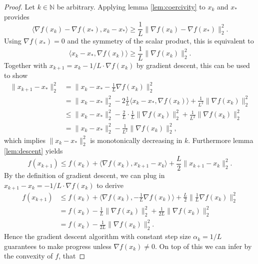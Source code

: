\documentclass[11pt, a4paper]{article}
\newcommand{\N}{\mathds{N}}
\begin{document}
\begin{proof}
Let $k \in \N$ be arbitrary. Applying lemma \ref{lem:coercivity} to $x_k$ and $x_*$ provides
\[ \big \langle \nabla f(x_k) - \nabla f(x_*), x_k - x_* \big \rangle \ge \frac{1}{L} \big \| \nabla f(x_k) - \nabla f(x_*) \big \|_2^2. \]
Using $\nabla f(x_*) = 0$ and the symmetry of the scalar product, this is equivalent to
\[ \big \langle x_k - x_* ,\nabla f(x_k) \big \rangle \ge \frac{1}{L} \big \| \nabla f(x_k) \big \|_2^2. \]
Together with $x_{k+1} = x_k - 1/L \cdot \nabla f(x_k)$ by gradient descent, this can be used to show
\begin{equation} \begin{split}
\big \| x_{k+1} - x_* \big \|_2^2
&= \big \| x_k - x_* - \frac{1}{L} \nabla f(x_k) \big \|_2^2 \\\
&= \big \| x_k - x_* \big \|_2^2 - 2 \frac{1}{L} \big \langle x_k - x_* , \nabla f(x_k) \big \rangle + \frac{1}{L^2} \big \| \nabla f(x_k) \big \|_2^2 \\\
&\leq \big \| x_k - x_* \big \|_2^2 - \frac{2}{L} \cdot \frac{1}{L} \big \| \nabla f(x_k) \big \|_2^2 + \frac{1}{L^2} \big \| \nabla f(x_k) \big \|_2^2 \\\
& = \big \| x_k - x_* \big \|_2^2 - \frac{1}{L^2} \big \| \nabla f(x_k) \big \|_2^2,
\end{split} \end{equation}
which implies $\big \| x_{k} - x_* \big \|_2^2$ is monotonically decreasing in $k$. Furthermore lemma \ref{lem:descent} yields
\[  f(x_{k+1}) \leq f(x_k) + \big \langle \nabla f(x_k) , x_{k+1} -x_k \big \rangle + \frac{L}{2} \big \| x_{k+1} - x_k \big \|_2^2. \]
By the definition of gradient descent, we can plug in $x_{k+1} - x_k = - 1/L \cdot \nabla f(x_k)$ to derive
\begin{equation} \begin{split} 
f(x_{k+1}) 
&\leq f(x_k) + \big \langle \nabla f(x_k) , - \frac{1}{L} \nabla f(x_k) \big \rangle + \frac{L}{2} \big \| \frac{1}{L} \nabla f(x_k) \big \|_2^2 \\\
&= f(x_k) - \frac{1}{L} \big \| \nabla f(x_k) \big \|_2^2 + \frac{1}{2L} \big \| \nabla f(x_k) \big \|_2^2 \\\
&= f(x_k) - \frac{1}{2L} \big \| \nabla f(x_k) \big \|_2^2.
\end{split} \end{equation}
Hence the gradient descent algorithm with constant step size $\alpha_k = 1/L$ guarantees to make progress unless $\nabla f(x_k) \neq 0$. On top of this we can infer by the convexity of $f$, that

\end{proof}
\end{document}
